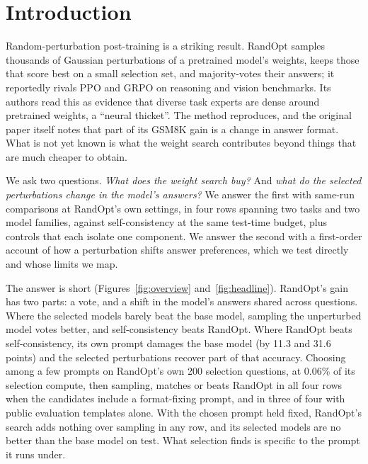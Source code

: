 \documentclass{article}
\begin{document}
\section{Introduction}\label{sec:intro}
Random-perturbation post-training \citep{gan2026thickets} is a striking result. RandOpt samples thousands of Gaussian
perturbations of a pretrained model's weights, keeps those that score best on a small selection set, and majority-votes
their answers; it reportedly rivals PPO and GRPO on reasoning and vision benchmarks. Its authors read this as evidence
that diverse task experts are dense around pretrained weights, a ``neural thicket''. The method reproduces, and the
original paper itself notes that part of its GSM8K gain is a change in answer format. What is not yet known is what
the weight search contributes beyond things that are much cheaper to obtain.

We ask two questions. \emph{What does the weight search buy?} And \emph{what do the selected perturbations change in
the model's answers?} We answer the first with same-run comparisons at RandOpt's own settings, in four rows spanning
two tasks and two model families, against self-consistency at the same test-time budget, plus controls that each
isolate one component. We answer the second with a first-order account of how a perturbation shifts answer
preferences, which we test directly and whose limits we map.

The answer is short (Figures~\ref{fig:overview} and~\ref{fig:headline}). RandOpt's gain has two parts: a vote, and a
shift in the model's answers shared across questions. Where the selected models barely beat the base model, sampling
the unperturbed model votes better, and self-consistency beats RandOpt. Where RandOpt beats self-consistency, its own
prompt damages the base model (by 11.3 and 31.6 points) and the selected perturbations recover part of that accuracy.
Choosing among a few prompts on RandOpt's own 200 selection questions, at 0.06\% of its selection compute, then
sampling, matches or beats RandOpt in all four rows when the candidates include a format-fixing prompt, and in three
of four with public evaluation templates alone. With the chosen prompt held fixed, RandOpt's search adds nothing over
sampling in any row, and its selected models are no better than the base model on test. What selection finds is
specific to the prompt it runs under.
\end{document}
